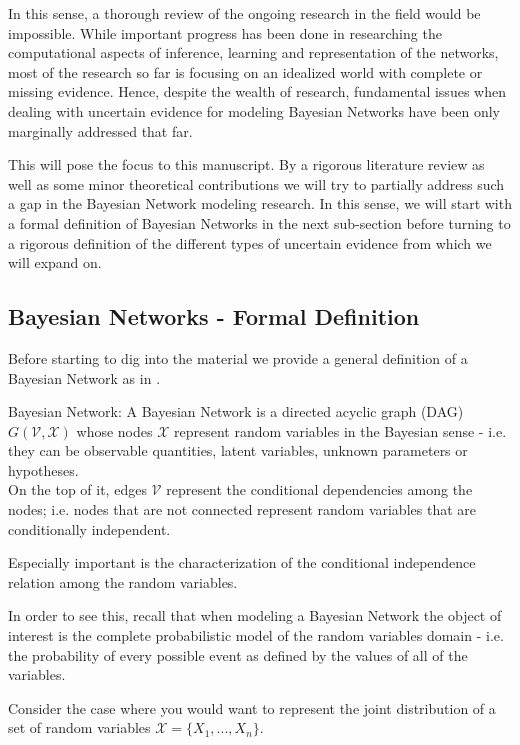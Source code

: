 \documentclass[11pt]{article}
\begin{document}
\begin{article}
In this sense, a thorough review of the ongoing research in the
field would be impossible. While important progress has been done
in researching the computational aspects of inference, learning and
representation of the networks, most of the research so far is
focusing on an idealized world with complete or missing
evidence. Hence, despite the wealth of research, fundamental issues
when dealing with uncertain evidence for modeling Bayesian Networks
have been only marginally addressed that far.

This will pose the focus to this manuscript. By a rigorous literature
review as well as some minor theoretical contributions we will try to
partially address such a gap in the Bayesian Network modeling
research. In this sense, we will start with a formal definition of
Bayesian Networks in the next sub-section before turning to a
rigorous definition of the different types of uncertain evidence
from which we will expand on.

\subsection{Bayesian Networks - Formal Definition}
\label{sec:org43d29af}
Before starting to dig into the material we provide a general
definition of a Bayesian Network as in \cite{pearl2011bayesian}.

\begin{definition}
Bayesian Network: A Bayesian Network is a directed acyclic graph (DAG) $G(\mathscr{V}, \mathscr{X})$
whose nodes $\mathscr{X}$ represent random variables in the Bayesian sense - i.e. they can be observable
quantities, latent variables, unknown parameters or hypotheses. \\
On the top of it, edges $\mathscr{V}$ represent the conditional dependencies among the nodes; i.e. nodes that
are not connected represent random variables that are conditionally independent.
\end{definition}

Especially important is the characterization of the conditional
independence relation among the random variables.

In order to see this, recall that when modeling a Bayesian Network
the object of interest is the complete probabilistic model of the
random variables domain - i.e. the probability of every possible
event as defined by the values of all of the variables.

Consider the case where you would want to represent the joint
distribution of a set of random variables \(\mathscr{X} = \{X_1, ...,
   X_n\}\).


\end{article}
\end{document}
